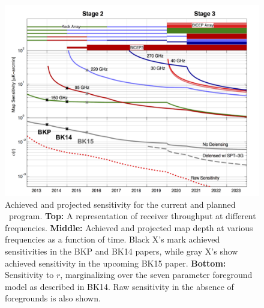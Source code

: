 \documentclass[]{spie}  %
\begin{document}
\begin{figure}[hb]
\center
\includegraphics[scale=0.4]{projections.pdf}
\caption{Achieved and projected sensitivity for the current and planned \bk\
program. \textbf{Top:} A representation of receiver throughput at different
frequencies. \textbf{Middle:} Achieved and projected map depth at various
frequencies as a function of time. Black X's mark achieved sensitivities in the
BKP\cite{bkplanck} and BK14\cite{bk_vi} papers, while gray X's show achieved
sensitivity in the upcoming BK15 paper. \textbf{Bottom:} Sensitivity to $r$,
marginalizing over the seven parameter foreground model as described in BK14.
Raw sensitivity in the absence of foregrounds is also shown.}
\label{fig:projections}
\end{figure}








\clearpage
\end{document}
